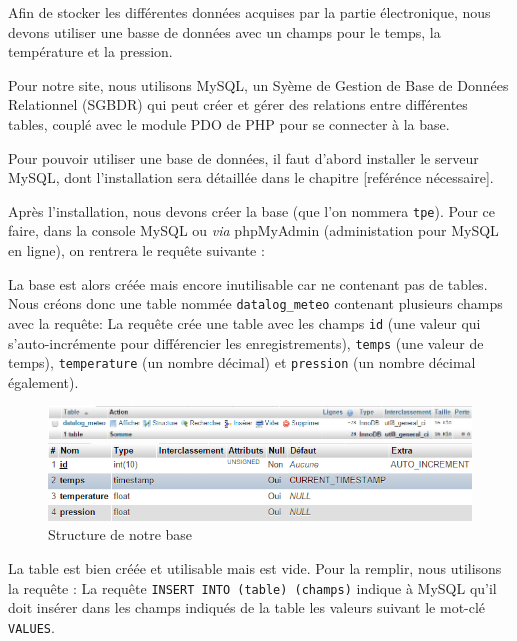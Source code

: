 Afin de stocker les différentes données acquises par la partie électronique, nous devons utiliser une basse de données avec un champs pour le temps, la température et la pression.

\Espace

Pour notre site, nous utilisons MySQL, un Syème de Gestion de Base de Données Relationnel (SGBDR) qui peut créer et gérer des relations entre différentes tables, couplé avec le module PDO de PHP pour se connecter à la base.

Pour pouvoir utiliser une base de données, il faut d'abord installer le serveur MySQL, dont l'installation sera détaillée dans le chapitre [reférénce nécessaire].

Après l'installation, nous devons créer la base (que l'on nommera \verb-tpe-). Pour ce faire, dans la console MySQL ou \emph{via} phpMyAdmin (administation pour MySQL en ligne), on rentrera le requête suivante :

La base est alors créée mais encore inutilisable car ne contenant pas de tables. Nous créons donc une table nommée \verb-datalog_meteo- contenant plusieurs champs avec la requête:
La requête crée une table avec les champs \verb-id- (une valeur qui s'auto-incrémente pour différencier les enregistrements), \verb-temps- (une valeur de temps), \verb-temperature- (un nombre décimal) et \verb-pression- (un nombre décimal également). 

\begin{figure}[!h]
	\centering
	\includegraphics[width=.8\linewidth]{Images/BDD}
	
	\vspace{5mm}
	
	\includegraphics[width=.8\linewidth]{Images/Structure_BDD}
	\caption{Structure de notre base}
\end{figure}

La table est bien créée et utilisable mais est vide. Pour la remplir, nous utilisons la requête :
La requête \verb-INSERT INTO (table) (champs)- indique à MySQL qu'il doit insérer dans les champs indiqués de la table les valeurs suivant le mot-clé \verb-VALUES-.

